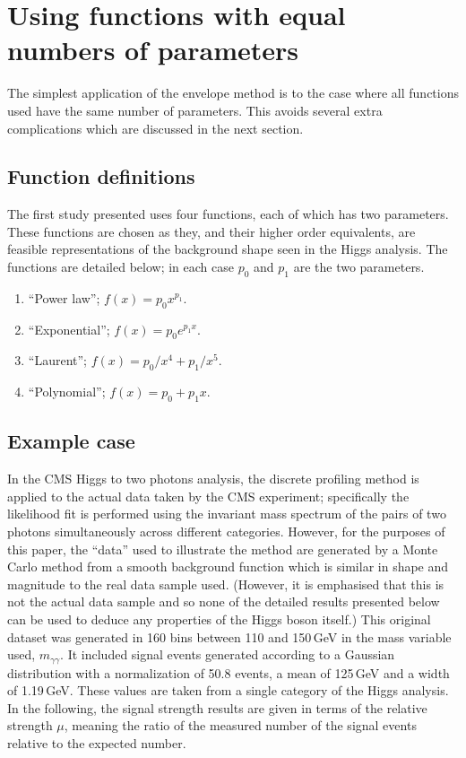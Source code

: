 \section{Using functions with equal numbers of parameters} %
\label{sec:functions}

The simplest application of the envelope method is to the case where all
functions used have the same number of parameters. This avoids several extra
complications which are discussed in the next section.

\subsection{Function definitions}
\label{sec:functions:function}

The first study presented uses four functions, each of which has two parameters.
These functions are chosen as they, and their higher order equivalents,
are feasible representations of the background shape seen in the Higgs
analysis. The functions are detailed below; in each case $p_0$ and $p_1$ are
the two parameters.
\begin{enumerate}
\item
``Power law''; $f(x) = p_0 x^{p_1}$.
\item
``Exponential''; $f(x) = p_0 e^{p_1x}$.
\item
``Laurent''; $f(x) = p_0/x^4 + p_1/x^5$.
\item
``Polynomial''; $f(x) = p_0 + p_1 x$.
\end{enumerate}

\subsection{Example case}
\label{sec:functions:example}

In the CMS Higgs to two photons analysis, the discrete profiling method is applied to
the actual data taken by the CMS experiment; specifically the likelihood fit
is performed using the invariant mass spectrum of the pairs of two photons simultaneously 
across different categories. 
However, for the purposes of this
paper, the ``data'' used to illustrate the method are generated by a Monte Carlo
method from a smooth background
function which is similar in shape and magnitude to the
real data sample used. (However, it is emphasised that this is not the 
actual data sample and so 
none of the detailed results presented below can be used to deduce any
properties of the Higgs boson itself.)
This original dataset was generated in 160 bins between 110 and 150\,GeV in
the mass variable used, $m_{\gamma\gamma}$.
It included signal events
generated according to a Gaussian distribution with a normalization of 50.8 events, a mean of 125\,GeV and a 
width of 1.19\,GeV. These values are taken from a single category of the 
Higgs analysis.
In the following, the signal strength results are given in
terms of the relative strength $\mu$, 
meaning the ratio of the measured number of the signal events relative
to the expected number.

